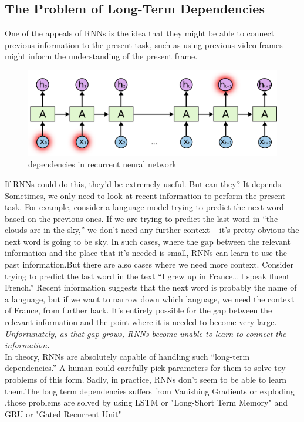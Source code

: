 \subsection{The Problem of Long-Term Dependencies}
\indent One of the appeals of RNNs is the idea that they might be able to connect previous information to the present task, such as using previous video frames might inform the understanding of the present frame.\\
 \begin{figure}[H]%
    \center%
    \includegraphics[width=\textwidth]{images/amir/RNN-longtermdependencies.png}%
    \caption[Deep(stacked) Rnn]{dependencies in recurrent neural network}\label{fig:RNN network-dep}%
  \end{figure}
  \indent If RNNs could do this, they’d be extremely useful. But can they? It depends.
Sometimes, we only need to look at recent information to perform the present task. For example, consider a language model trying to predict the next word based on the previous ones. If we are trying to predict the last word in “the clouds are in the sky,” we don’t need any further context – it’s pretty obvious the next word is going to be sky. In such cases, where the gap between the relevant information and the place that it’s needed is small, RNNs can learn to use the past information.But there are also cases where we need more context. Consider trying to predict the last word in the text “I grew up in France… I speak fluent French.” Recent information suggests that the next word is probably the name of a language, but if we want to narrow down which language, we need the context of France, from further back. It’s entirely possible for the gap between the relevant information and the point where it is needed to become very large.
\textit{Unfortunately, as that gap grows, RNNs become unable to learn to connect the information.}\\
\indent In theory, RNNs are absolutely capable of handling such “long-term dependencies.” A human could carefully pick parameters for them to solve toy problems of this form. Sadly, in practice, RNNs don’t seem to be able to learn them.The long term dependencies suffers from Vanishing Gradients or exploding ,those problems are solved by using LSTM or "Long-Short Term Memory" and GRU or "Gated Recurrent Unit"

